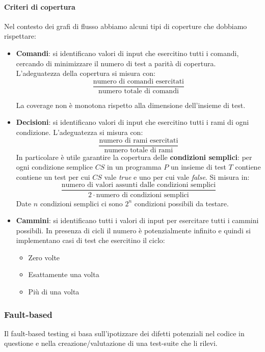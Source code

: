 \paragraph{Criteri di copertura} Nel contesto dei grafi di flusso abbiamo alcuni tipi di coperture che dobbiamo rispettare:
\begin{itemize}
	\item \textbf{Comandi}: si identificano valori di input che esercitino tutti i comandi, cercando di minimizzare il numero di test a parità di copertura. L'adeguatezza della copertura si misura con:
	\begin{equation*}
		\frac{\text{numero di comandi esercitati}}{\text{numero totale di comandi}}
	\end{equation*}
	\begin{note}
		La coverage non è monotona rispetto alla dimensione dell'insieme di test.
	\end{note}
	\item \textbf{Decisioni}: si identificano valori di input che esercitino tutti i rami di ogni condizione. L'adeguatezza si misura con:
	\begin{equation*}
		\frac{\text{numero di rami esercitati}}{\text{numero totale di rami}}
	\end{equation*}
	In particolare è utile garantire la copertura delle \textbf{condizioni semplici}: per ogni condizione semplice $CS$ in un programma $P$ un insieme di test $T$ contiene contiene un test per cui $CS$ vale \textit{true} e uno per cui vale \textit{false}. Si misura in:
	\begin{equation*}
		\frac{\text{numero di valori assunti dalle condizioni semplici}}{2 \cdot\text{numero di condizioni semplici}}
	\end{equation*}
	Date $n$ condizioni semplici ci sono $2^n$ condizioni possibili da testare.
	\item \textbf{Cammini}: si identificano tutti i valori di input per esercitare tutti i cammini possibili. In presenza di cicli il numero è potenzialmente infinito e quindi si implementano casi di test che esercitino il ciclo:
	\begin{itemize}
		\item Zero volte
		\item Esattamente una volta
		\item Più di una volta
	\end{itemize}
\end{itemize}

\subsubsection{Fault-based}
Il fault-based testing si basa sull'ipotizzare dei difetti potenziali nel codice in questione e nella creazione/valutazione di una test-suite che li rilevi.\\

